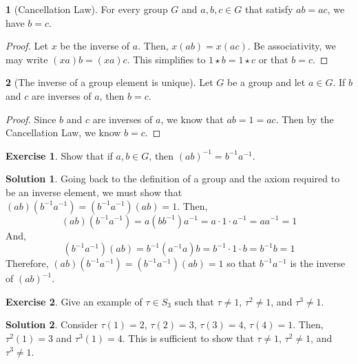 \documentclass[12pt]{article}
\theoremstyle{definition}
\newtheorem{theorem}{\color{ForestGreen}{\textbf{Theorem}}}
\newtheorem{exercise}{\color{YellowOrange}Exercise}
\theoremstyle{definition}
\newtheorem{solution}{\color{Goldenrod}Solution}
\begin{document}
\begin{theorem}[Cancellation Law]
For every group $G$ and $a,b,c \in G$ that satisfy $ab = ac$, we have $b=c$.
\end{theorem}
\begin{proof}
Let $x$ be the inverse of $a$. Then, $x(ab) = x(ac)$. Be associativity, we may write $(xa)b = (xa)c$. This simplifies to $1 \star b = 1 \star c$ or that $b = c$.
\end{proof}

\begin{theorem}[The inverse of a group element is unique]
Let $G$ be a group and let $a \in G$. If $b$ and $c$ are inverses of $a$, then $b = c$. 
\end{theorem}
\begin{proof}
Since $b$ and $c$ are inverses of $a$, we know that $ab = 1 = ac$. Then by the Cancellation Law, we know $b=c$.
\end{proof}

\begin{exercise}
Show that if $a,b \in G$, then $(ab)^{-1} = b^{-1}a^{-1}$.
\end{exercise}
\begin{solution} Going back to the definition of a group and the axiom required to be an inverse element, we must show that $(ab)(b^{-1}a^{-1}) = (b^{-1}a^{-1})(ab) = 1$. Then,
\begin{equation}
(ab)(b^{-1}a^{-1}) = a (bb^{-1}) a^{-1} = a \cdot 1 \cdot a^{-1} = aa^{-1} = 1
\end{equation}
And,
\begin{equation}
(b^{-1}a^{-1})(ab) = b^{-1} (a^{-1}a) b = b^{-1} \cdot 1 \cdot b = b^{-1}b = 1
\end{equation}
Therefore, $(ab)(b^{-1}a^{-1}) = (b^{-1}a^{-1})(ab) = 1$ so that $b^{-1}a^{-1}$ is the inverse of $(ab)^{-1}$.
\end{solution}

\begin{exercise}
Give an example of $\tau \in S_3$ such that $\tau \neq 1$, $\tau^2 \neq 1$, and $\tau^3 \neq 1$.
\end{exercise}
\begin{solution}
Consider $\tau(1) = 2$, $\tau(2) = 3$, $\tau(3) = 4$, $\tau(4) = 1$. Then, $\tau^2(1) = 3$ and $\tau^3(1) = 4$. This is sufficient to show that $\tau \neq 1$, $\tau^2 \neq 1$, and $\tau^3 \neq 1$.
\end{solution}
\end{document}
